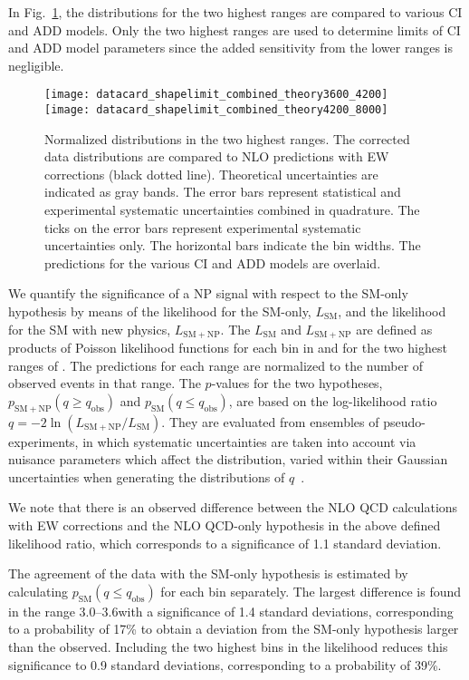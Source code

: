 \documentclass[11pt,twoside,a4paper,cmspaper,final,collab]{cms-tdr}
\begin{document}
In Fig.~\ref{fig:data_results_theories}, the \chijj distributions for
the two highest \mjj ranges are compared to various CI and ADD models.
Only the two highest \mjj ranges are used to determine limits of
CI and ADD model parameters since the added sensitivity from the lower \mjj ranges is negligible.

\begin{figure}[htbp]
  \centering
  \texttt{[image: datacard\_shapelimit\_combined\_theory3600\_4200]}
  \texttt{[image: datacard\_shapelimit\_combined\_theory4200\_8000]}
  \caption{Normalized \chijj distributions in the two highest \mjj ranges. The corrected data
    distributions are compared to NLO predictions with EW corrections
    (black dotted line). Theoretical uncertainties are indicated as
    gray bands. The error bars represent statistical and experimental
    systematic uncertainties combined in quadrature. The ticks on the
    error bars represent experimental systematic uncertainties
    only. The horizontal bars indicate the bin widths. The predictions for the various CI and ADD models are
    overlaid.}
  \label{fig:data_results_theories}
\end{figure}


We quantify the significance of a NP signal with respect to
the SM-only hypothesis by means of the likelihood for the SM-only,
$L_\mathrm{SM}$, and the likelihood for the SM with new physics, $L_\mathrm{SM+NP}$.
The $L_\mathrm{SM}$ and $L_\mathrm{SM+NP}$ are defined as products of Poisson likelihood functions
for each bin in \chijj and for the two highest ranges of \mjj.
The predictions for each \mjj range are normalized to the number of
observed events in that range. The $p$-values for the two hypotheses,
$p_\mathrm{SM+NP}(q \geq q_\text{obs})$ and $p_\mathrm{SM}(q \leq
q_\text{obs})$, are based on the log-likelihood ratio $q = -2 \ln
(L_\mathrm{SM+NP}/L_\mathrm{SM})$. They are evaluated from
ensembles of pseudo-experiments, in which systematic uncertainties are
taken into account via nuisance parameters which affect the \chijj
distribution, varied within their Gaussian uncertainties when
generating the distributions of $q$~\cite{cousinshighland}.

We note that there is an observed difference between
the NLO QCD calculations with EW corrections
and
the NLO QCD-only hypothesis
in the above defined likelihood ratio,
which corresponds to a significance of 1.1 standard deviation.


The agreement of the data with the SM-only hypothesis is estimated by
calculating $p_\mathrm{SM}(q \leq q_\text{obs})$ for each \mjj bin separately.
The largest difference is found in the \mjj range 3.0--3.6\TeV with a
significance of 1.4 standard deviations, corresponding to a
probability of 17\% to obtain a deviation from the SM-only hypothesis
larger than the observed.
Including the two highest \mjj bins in the likelihood reduces this significance
to 0.9 standard deviations, corresponding to a probability of 39\%.
\end{document}
